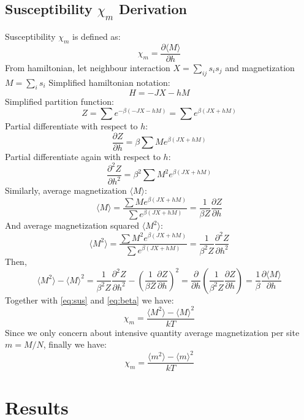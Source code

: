 \documentclass[a4paper]{article}
\numberwithin{equation}{section}
\begin{document}
\subsection{Susceptibility $\chi_m$ Derivation}
Susceptibility $\chi_m$ is defined as:
\begin{equation}
\chi_m=\frac{\partial \langle M \rangle}{\partial h}\label{eq:sus}
\end{equation}
From hamiltonian, let neighbour interaction $X=\sum_{ij} s_i s_j$ and magnetization $M=\sum_{i} s_i $
Simplified hamiltonian notation:
$$H = -JX-hM$$
Simplified partition function:
$$Z=\sum e^{-\beta (-JX-hM)}=\sum e^{\beta(JX+hM)}$$
Partial differentiate with respect to $h$:
$$\frac{\partial Z}{\partial h}=\beta\sum Me^{\beta(JX+hM)}$$
Partial differentiate again with respect to $h$:
$$\frac{\partial ^2 Z}{\partial h^2}=\beta^2\sum M^2e^{\beta(JX+hM)}$$
Similarly, average magnetization $\langle M \rangle$:
$$\langle M \rangle=\frac{\sum Me^{\beta(JX+hM)}}{\sum e^{\beta(JX+hM)}}=\frac{1}{\beta Z}\frac{\partial Z}{\partial h}$$
And average magnetization squared $\langle M^2 \rangle$:
$$\langle M^2 \rangle=\frac{\sum M^2e^{\beta(JX+hM)}}{\sum e^{\beta(JX+hM)}}=\frac{1}{\beta^2 Z}\frac{\partial^2 Z}{\partial h^2}$$
Then,
$$\langle M^2 \rangle-\langle M \rangle^2=\frac{1}{\beta^2 Z}\frac{\partial^2 Z}{\partial h^2}-\left(\frac{1}{\beta Z}\frac{\partial Z}{\partial h} \right)^2=\frac{\partial}{\partial h}\left(\frac{1}{\beta^2 Z}\frac{\partial Z}{\partial h}\right)=\frac{1}{\beta}\frac{\partial \langle M \rangle}{\partial h}$$
Together with \ref{eq:sus} and \ref{eq:beta} we have:
$$\chi_m=\frac{\langle M^2 \rangle-\langle M \rangle^2}{kT}$$
Since we only concern about intensive quantity average magnetization per site $m=M/N$, finally we have:
$$\chi_m=\frac{\langle m^2 \rangle-\langle m \rangle^2}{kT}$$
\section{Results}
\end{document}
